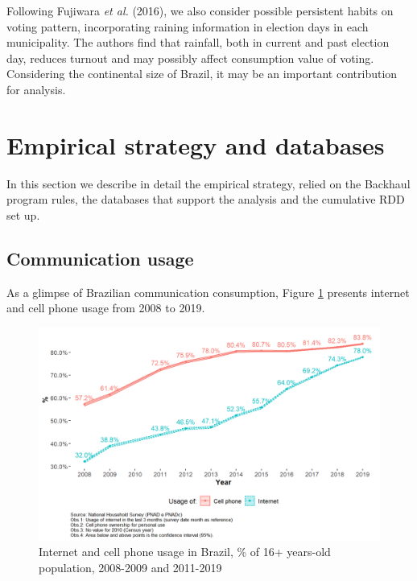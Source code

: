 \documentclass[
  12pt,
]{article}
\begin{document}
Following Fujiwara \emph{et al.} (2016), we also consider possible
persistent habits on voting pattern, incorporating raining information
in election days in each municipality. The authors find that rainfall,
both in current and past election day, reduces turnout and may possibly
affect consumption value of voting. Considering the continental size of
Brazil, it may be an important contribution for analysis.

\hypertarget{empirical-strategy-and-databases}{%
\section{Empirical strategy and
databases}\label{empirical-strategy-and-databases}}

In this section we describe in detail the empirical strategy, relied on
the Backhaul program rules, the databases that support the analysis and
the cumulative RDD set up.

\hypertarget{communication-usage}{%
\subsection{Communication usage}\label{communication-usage}}

As a glimpse of Brazilian communication consumption, Figure \ref{fig:0}
presents internet and cell phone usage from 2008 to 2019.

\begin{figure}
\centering
\includegraphics{artigo1_files/figure-latex/internet_usage-1.png}
\caption{Internet and cell phone usage in Brazil, \% of 16+ years-old
population, 2008-2009 and 2011-2019 \label{fig:0}}
\end{figure}
\end{document}
